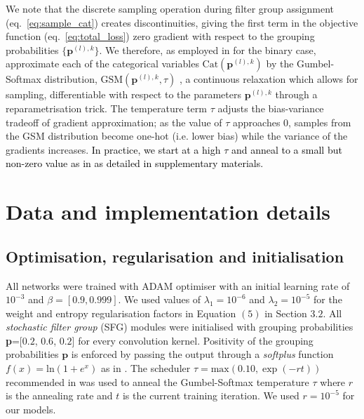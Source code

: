 We note that the discrete sampling operation during filter group assignment (eq.~\eqref{eq:sample_cat}) creates discontinuities, giving the first term in the objective function (eq.~\ref{eq:total_loss}) zero gradient with respect to the grouping probabilities $\{\mathbf{p}^{(l),k}\}$. We therefore, as employed in \cite{kendall2017multi} for the binary case, approximate each of the categorical variables $\text{Cat}(\mathbf{p}^{(l),k})$ by the Gumbel-Softmax distribution, $\text{GSM}(\mathbf{p}^{(l),k}, \tau)$ \cite{maddison2016concrete,jang2016categorical}, a continuous relaxation which allows for sampling, differentiable with respect to the parameters $\mathbf{p}^{(l),k}$ through a reparametrisation trick. The temperature term $\tau$ adjusts the bias-variance tradeoff of gradient approximation; as the value of $\tau$ approaches 0, samples from the GSM distribution become one-hot (i.e. lower bias) while the variance of the gradients increases. \textcolor{black}{In practice, we start at a high $\tau$ and anneal to a small but non-zero value as in \cite{jang2016categorical,gal2017concrete} as detailed in supplementary materials.}





\section{Data and implementation details}

\subsection{Optimisation, regularisation and initialisation}
All networks were trained with ADAM optimiser \cite{ADAM} with an initial learning rate of $10^{-3}$ and $\beta = [0.9, 0.999]$. We used values of $\lambda_1=10^{-6}$ and $\lambda_2=10^{-5}$ for the weight and entropy regularisation factors in Equation $(5)$ in Section $3.2$. All \emph{stochastic filter group} (SFG) modules were initialised with grouping probabilities \textbf{p}=[$0.2$, $0.6$, $0.2$] for every convolution kernel. Positivity of the grouping probabilities $\textbf{p}$ is enforced by passing the output through a \emph{softplus} function $f(x)=\text{ln}(1+e^{x})$ as in \cite{lakshminarayanan2017simple}. The scheduler $\tau = \text{max}(0.10, \exp(-rt))$ recommended in \cite{jang2016categorical} was used to anneal the Gumbel-Softmax temperature $\tau$ where $r$ is the annealing rate and $t$ is the current training iteration. We used $r=10^{-5}$ for our models.

